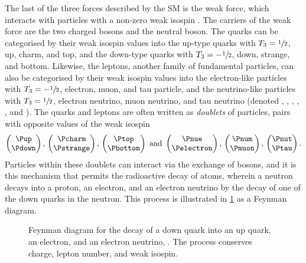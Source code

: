 The last of the three forces described by the \ac{SM} is the weak force, which 
interacts with particles with a non-zero weak isospin \wisospin.
The carriers of the weak force are the two charged \PWpm bosons and the neutral 
\PZ boson.
The quarks can be categorised by their weak isospin values into the up-type 
quarks with $T_{3} = \sfrac{1}{2}$, up, charm, and top, and the down-type 
quarks with $T_{3} = -\sfrac{1}{2}$, down, strange, and bottom.
Likewise, the leptons, another family of fundamental particles, can also be 
categorised by their weak isospin values into the electron-like particles with 
$T_{3} = -\sfrac{1}{2}$, electron, muon, and tau particle, and the 
neutrino-like particles with $T_{3} = \sfrac{1}{2}$, electron neutrino, 
muon neutrino, and tau neutrino (denoted \Pelectron, \Pmuon, \Ptau, \Pnue, 
\Pnum, and \Pnut).
The quarks and leptons are often written as \emph{doublets} of particles, pairs 
with opposite values of the weak isospin
\begin{equation}
  \begin{pmatrix}\Pup\\\Pdown\end{pmatrix},\,
  \begin{pmatrix}\Pcharm\\\Pstrange\end{pmatrix},\,
  \begin{pmatrix}\Ptop\\\Pbottom\end{pmatrix}
  \text{\ and\ }
  \begin{pmatrix}\Pnue\\\Pelectron\end{pmatrix},\,
  \begin{pmatrix}\Pnum\\\Pmuon\end{pmatrix},\,
  \begin{pmatrix}\Pnut\\\Ptau\end{pmatrix}.
  \label{intro:sm:weak_doublets}
\end{equation}
Particles within these doublets can interact via the exchange of \PWpm bosons, 
and it is this mechanism that permits the radioactive decay of atoms, wherein a 
neutron decays into a proton, an electron, and an electron neutrino by the 
decay of one of the down quarks in the neutron.
This process is illustrated in \cref{fig:intro:sm:neutron_decay} as a Feynman 
diagram.

\begin{figure}
  \centering
  
  \caption{%
    Feynman diagram for the decay of a down quark into an up quark, an 
    electron, and an electron neutrino, \decay{\Pdown}{\Pup\Pelectron\APnue}.
    The process conserves charge, lepton number, and weak isospin.
  }
  \label{fig:intro:sm:neutron_decay}
\end{figure}

